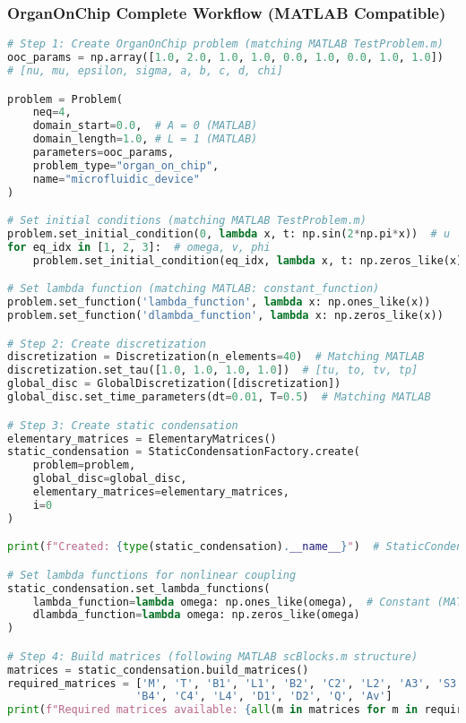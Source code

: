 \subsubsection{OrganOnChip Complete Workflow (MATLAB Compatible)}

\begin{lstlisting}[language=Python, caption=Complete OrganOnChip Workflow]
# Step 1: Create OrganOnChip problem (matching MATLAB TestProblem.m)
ooc_params = np.array([1.0, 2.0, 1.0, 1.0, 0.0, 1.0, 0.0, 1.0, 1.0])
# [nu, mu, epsilon, sigma, a, b, c, d, chi]

problem = Problem(
    neq=4,
    domain_start=0.0,  # A = 0 (MATLAB)
    domain_length=1.0, # L = 1 (MATLAB)
    parameters=ooc_params,
    problem_type="organ_on_chip",
    name="microfluidic_device"
)

# Set initial conditions (matching MATLAB TestProblem.m)
problem.set_initial_condition(0, lambda x, t: np.sin(2*np.pi*x))  # u
for eq_idx in [1, 2, 3]:  # omega, v, phi
    problem.set_initial_condition(eq_idx, lambda x, t: np.zeros_like(x))

# Set lambda function (matching MATLAB: constant_function)
problem.set_function('lambda_function', lambda x: np.ones_like(x))
problem.set_function('dlambda_function', lambda x: np.zeros_like(x))

# Step 2: Create discretization
discretization = Discretization(n_elements=40)  # Matching MATLAB
discretization.set_tau([1.0, 1.0, 1.0, 1.0])  # [tu, to, tv, tp]
global_disc = GlobalDiscretization([discretization])
global_disc.set_time_parameters(dt=0.01, T=0.5)  # Matching MATLAB

# Step 3: Create static condensation
elementary_matrices = ElementaryMatrices()
static_condensation = StaticCondensationFactory.create(
    problem=problem,
    global_disc=global_disc,
    elementary_matrices=elementary_matrices,
    i=0
)

print(f"Created: {type(static_condensation).__name__}")  # StaticCondensationOOC

# Set lambda functions for nonlinear coupling
static_condensation.set_lambda_functions(
    lambda_function=lambda omega: np.ones_like(omega),  # Constant (MATLAB)
    dlambda_function=lambda omega: np.zeros_like(omega)
)

# Step 4: Build matrices (following MATLAB scBlocks.m structure)
matrices = static_condensation.build_matrices()
required_matrices = ['M', 'T', 'B1', 'L1', 'B2', 'C2', 'L2', 'A3', 'S3', 'H3', 
                    'B4', 'C4', 'L4', 'D1', 'D2', 'Q', 'Av']
print(f"Required matrices available: {all(m in matrices for m in required_matrices)}")


\end{lstlisting}
